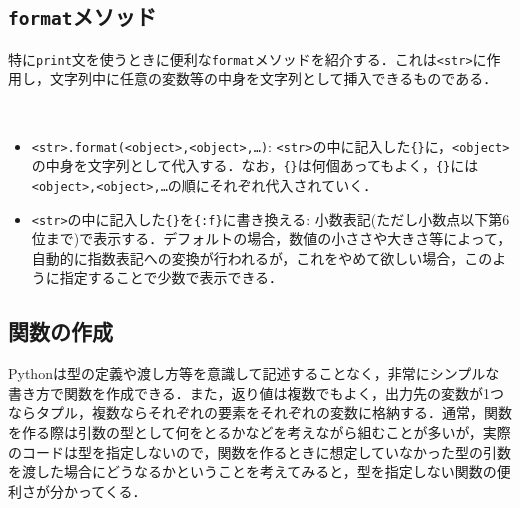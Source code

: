 \begin{cod}[\texttt{py3.py}]　
}]{code/py3.py}
\vspace{-7pt}
\begin{lstlisting}
<class 'str'>
<class 'type'>
\end{lstlisting}
\end{cod}
\vspace{-10pt}

\subsection{\texttt{format}メソッド}

特に\texttt{print}文を使うときに便利な\texttt{format}メソッドを紹介する．これは\texttt{<str>}に作用し，文字列中に任意の変数等の中身を文字列として挿入できるものである．

\begin{gram}　
\begin{itemize}
\item \texttt{<str>.format(<object>,<object>,\ldots)}: \texttt{<str>}の中に記入した\texttt{\{\}}に，\texttt{<object>}の中身を文字列として代入する．なお，\texttt{\{\}}は何個あってもよく，\texttt{\{\}}には\texttt{<object>,<object>,\ldots}の順にそれぞれ代入されていく．
\item \texttt{<str>}の中に記入した\texttt{\{\}}を\texttt{\{:f\}}に書き換える: 小数表記(ただし小数点以下第6位まで)で表示する．デフォルトの場合，数値の小ささや大きさ等によって，自動的に指数表記への変換が行われるが，これをやめて欲しい場合，このように指定することで少数で表示できる．
\end{itemize}
\end{gram}

\begin{cod}[\texttt{py4.py}]　
}]{code/py4.py}
\vspace{-7pt}
\begin{lstlisting}
p={'x': 3, 'y': 5}, type=<class 'dict'>
alpha=1e-06
alpha=0.000001
\end{lstlisting}
\end{cod}
\vspace{-10pt}


\subsection{関数の作成}
Pythonは型の定義や渡し方等を意識して記述することなく，非常にシンプルな書き方で関数を作成できる．また，返り値は複数でもよく，出力先の変数が1つならタプル，複数ならそれぞれの要素をそれぞれの変数に格納する．通常，関数を作る際は引数の型として何をとるかなどを考えながら組むことが多いが，実際のコードは型を指定しないので，関数を作るときに想定していなかった型の引数を渡した場合にどうなるかということを考えてみると，型を指定しない関数の便利さが分かってくる．

